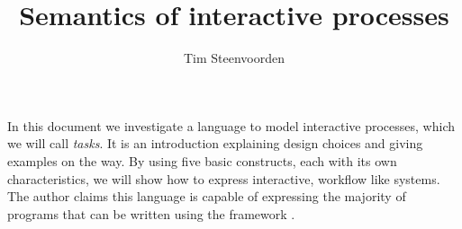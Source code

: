 \documentclass
  [a4paper
  ,justified
  ,nofonts
  ]{tufte-handout}
\begin{document}
\title{Semantics of interactive processes}
\author{Tim Steenvoorden}

\maketitle

In this document we investigate a language to model interactive processes,
which we will call \emph{tasks}.
It is an introduction explaining design choices and giving examples on the way.
By using five basic constructs,
each with its own characteristics,
we will show how to express interactive, workflow like systems.
The author claims this language is capable of expressing the majority of programs that can be written using the \ITASKS framework \cite{conf/pepm/PlasmeijerAKLNG11}.

\tableofcontents
\newpage













\end{document}
